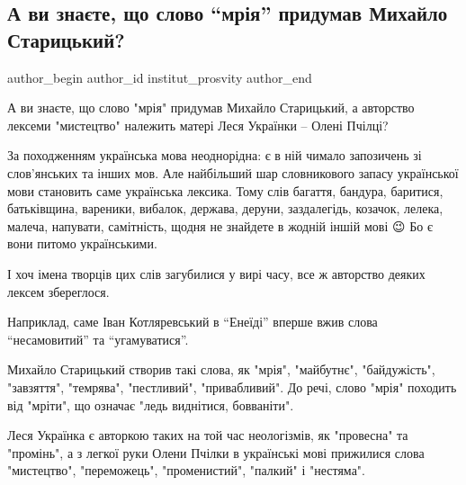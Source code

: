  
 
 
 
 
 
\subsection{А ви знаєте, що слово \enquote{мрія} придумав Михайло Старицький?}
\label{sec:28_01_2020.fb.institut_prosvity.1.slovo_mrija_starickij}
 
\ifcmt
 author_begin
   author_id institut_prosvity
 author_end
\fi

А ви знаєте, що слово "мрія" придумав Михайло Старицький, а авторство лексеми
"мистецтво" належить матері Леся Українки – Олені Пчілці?

За походженням українська мова неоднорідна: є в ній чимало запозичень зі
слов’янських та інших мов. Але найбільший шар словникового запасу української
мови становить саме українська лексика. Тому слів багаття, бандура, баритися,
батьківщина, вареники, вибалок, держава, деруни, заздалегідь, козачок, лелека,
малеча, напувати, самітність, щодня не знайдете в жодній іншій мові 😉 Бо є
вони питомо українськими.

І хоч імена творців цих слів загубилися у вирі часу, все ж авторство деяких
лексем збереглося.

Наприклад, саме Іван Котляревський в \enquote{Енеїді} вперше вжив слова
\enquote{несамовитий} та \enquote{угамуватися}.

Михайло Старицький створив такі слова, як "мрія", "майбутнє", "байдужість",
"завзяття", "темрява", "пестливий", "привабливий". До речі, слово "мрія"
походить від "мріти", що означає "ледь виднітися, бовваніти".

Леся Українка є авторкою таких на той час неологізмів, як "провесна" та
"промінь", а з легкої руки Олени Пчілки в українські мові прижилися слова
"мистецтво", "переможець", "променистий", "палкий" і "нестяма".


